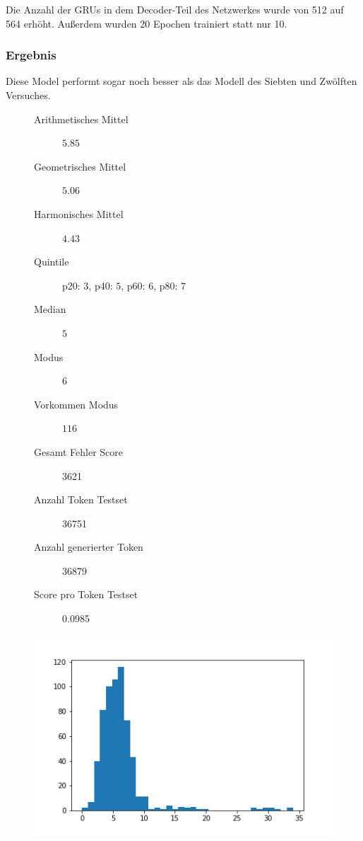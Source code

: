 \documentclass[pdftex,a4paper,halfparskip, article]{scrartcl}
\begin{document}
Die Anzahl der GRUs in dem Decoder-Teil des Netzwerkes wurde von 512 auf 564 erhöht. Außerdem wurden 20 Epochen trainiert statt nur 10.

\subsubsection*{Ergebnis}

Diese Model performt sogar noch besser als das Modell des Siebten und Zwölften Versuches.

\begin{figure}
\centering
\begin{minipage}{.5\textwidth}
  \centering
  \begin{description}
	\item[Arithmetisches Mittel] $5.85$	
	\item[Geometrisches Mittel] $5.06$
	\item[Harmonisches Mittel] $4.43$
	\item[Quintile] p20: $3$, p40: $5$, p60: $6$, p80: $7$
	\item[Median] $5$
	\item[Modus] $6$
	\item[Vorkommen Modus] $116$
	\item[Gesamt Fehler Score] 3621
	\item[Anzahl Token Testset] 36751 
	\item[Anzahl generierter Token] 36879
	\item[Score pro Token Testset]  0.0985
\end{description}
  \label{fig:lage_bin16}
\end{minipage}%
\begin{minipage}{.5\textwidth}
  \centering
  \includegraphics[width=1\linewidth]{predictions_bin18_2_histogramm}
  \label{fig:hist_bin18}
\end{minipage}
\end{figure}
\end{document}

